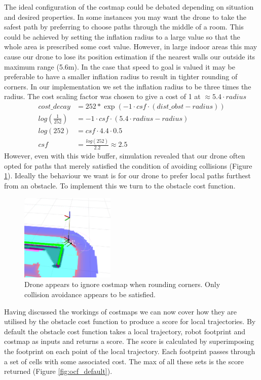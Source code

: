 \documentclass[capstone_report.tex]{subfiles}
\begin{document}
The ideal configuration of the costmap could be debated depending on situation and desired properties.  In some instances you may want the drone to take the safest path by preferring to choose paths through the middle of a room.  This could be achieved by setting the inflation radius to a large value so that the whole area is prescribed some cost value.  However, in large indoor areas this may cause our drone to lose its position estimation if the nearest walls our outside its maximum range (5.6m).  In the case that speed to goal is valued it may be preferable to have a smaller inflation radius to result in tighter rounding of corners.  In our implementation we set the inflation radius to be three times the radius.  The cost scaling factor was chosen to give a cost of 1 at $\approx 5.4\cdot radius$
\begin{align*}
    cost\_decay &= 252*\exp(-1 \cdot csf \cdot (dist\_obst - radius))\\
    log(\frac{1}{252}) &= -1 \cdot csf \cdot (5.4\cdot radius - radius)\\
    log(252) &= csf \cdot 4.4\cdot0.5\\
    csf &=    \frac{log(252)}{2.2}
        \approx 2.5
\end{align*}
  However, even with this wide buffer, simulation revealed that our drone often opted for paths that merely satisfied the condition of avoiding collisions (Figure \ref{fig:tight_rounding}).  Ideally the behaviour we want is for our drone to prefer local paths furthest from an obstacle.  To implement this we turn to the obstacle cost function.

\begin{figure}[H]
    \centering
    \includegraphics[width=0.4\textwidth]{imgs/does_not_obey_costmap.png}
    \caption{Drone appears to ignore costmap when rounding corners.  Only collision avoidance appears to be satisfied.}\label{fig:tight_rounding}
\end{figure}

Having discussed the workings of costmaps we can now cover how they are utilised by the obstacle cost function to produce a score for local trajectories.  By default the obstacle cost function takes a local trajectory, robot footprint and costmap as inputs and returns a score.  The score is calculated by superimposing the footprint on each point of the local trajectory.  Each footprint passes through a set of cells with some associated cost.  The max of all these sets is the score returned (Figure \ref{fig:ocf_default}). \\
\end{document}
